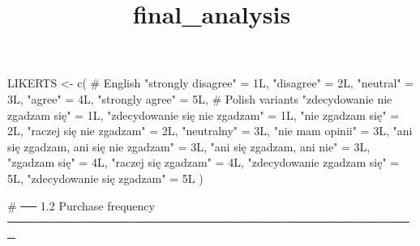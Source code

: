 \documentclass[
  letterpaper,
  DIV=11,
  numbers=noendperiod]{scrartcl}
\title{final\_analysis}
\author{}
\date{}
\newenvironment{Shaded}{\begin{snugshade}}{\end{snugshade}}
\newcommand{\CommentTok}[1]{\textcolor[rgb]{0.37,0.37,0.37}{#1}}
\newcommand{\DecValTok}[1]{\textcolor[rgb]{0.68,0.00,0.00}{#1}}
\newcommand{\FunctionTok}[1]{\textcolor[rgb]{0.28,0.35,0.67}{#1}}
\newcommand{\NormalTok}[1]{\textcolor[rgb]{0.00,0.23,0.31}{#1}}
\newcommand{\OtherTok}[1]{\textcolor[rgb]{0.00,0.23,0.31}{#1}}
\newcommand{\StringTok}[1]{\textcolor[rgb]{0.13,0.47,0.30}{#1}}
\begin{document}
\maketitle


\begin{Shaded}
\begin{Highlighting}[]
\NormalTok{LIKERTS }\OtherTok{\textless{}{-}} \FunctionTok{c}\NormalTok{(}
  \CommentTok{\# English}
  \StringTok{"strongly disagree"}                         \OtherTok{=} \DecValTok{1}\NormalTok{L,}
  \StringTok{"disagree"}                                  \OtherTok{=} \DecValTok{2}\NormalTok{L,}
  \StringTok{"neutral"}                                   \OtherTok{=} \DecValTok{3}\NormalTok{L,}
  \StringTok{"agree"}                                     \OtherTok{=} \DecValTok{4}\NormalTok{L,}
  \StringTok{"strongly agree"}                            \OtherTok{=} \DecValTok{5}\NormalTok{L,}
  \CommentTok{\# Polish variants}
  \StringTok{"zdecydowanie nie zgadzam się"}              \OtherTok{=} \DecValTok{1}\NormalTok{L,}
  \StringTok{"zdecydowanie się nie zgadzam"}              \OtherTok{=} \DecValTok{1}\NormalTok{L,}
  \StringTok{"nie zgadzam się"}                           \OtherTok{=} \DecValTok{2}\NormalTok{L,}
  \StringTok{"raczej się nie zgadzam"}                    \OtherTok{=} \DecValTok{2}\NormalTok{L,}
  \StringTok{"neutralny"}                                 \OtherTok{=} \DecValTok{3}\NormalTok{L,}
  \StringTok{"nie mam opinii"}                            \OtherTok{=} \DecValTok{3}\NormalTok{L,}
  \StringTok{"ani się zgadzam, ani się nie zgadzam"}      \OtherTok{=} \DecValTok{3}\NormalTok{L,}
  \StringTok{"ani się zgadzam, ani nie"}                  \OtherTok{=} \DecValTok{3}\NormalTok{L,}
  \StringTok{"zgadzam się"}                               \OtherTok{=} \DecValTok{4}\NormalTok{L,}
  \StringTok{"raczej się zgadzam"}                        \OtherTok{=} \DecValTok{4}\NormalTok{L,}
  \StringTok{"zdecydowanie zgadzam się"}                  \OtherTok{=} \DecValTok{5}\NormalTok{L,}
  \StringTok{"zdecydowanie się zgadzam"}                  \OtherTok{=} \DecValTok{5}\NormalTok{L}
\NormalTok{)}

\CommentTok{\# ── 1.2  Purchase frequency ───────────────────────────────────────────────────}


\end{Highlighting}
\end{Shaded}
\end{document}
